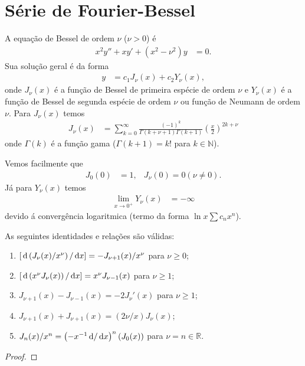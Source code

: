 \section{Série de Fourier-Bessel}
A equação de Bessel de ordem $\nu$ ($\nu > 0$) é
\begin{align*}
    x^2 y'' + x y' + \left( x^2 - \nu^2 \right) y &= 0.
\end{align*}
Sua solução geral é da forma
\begin{align*}
    y &= c_1 J_\nu(x) + c_2 Y_\nu(x),
\end{align*}
onde $J_\nu(x)$ é a função de Bessel de primeira espécie de ordem $\nu$ e $Y_\nu(x)$ é a função de Bessel de segunda espécie de ordem $\nu$ ou função de Neumann de ordem $\nu$. Para $J_\nu(x)$ temos
\begin{align*}
    J_\nu(x) &= \sum_{k = 0}^\infty \frac{(-1)^k}{\Gamma(k + \nu + 1) \Gamma(k + 1)} \left( \frac{x}{2} \right)^{2k + \nu}
\end{align*}
onde $\Gamma(k)$ é a função gama ($\Gamma(k + 1) = k!$ para $k \in \mathbb{N}$).

Vemos facilmente que
\begin{align*}
    J_0(0) &= 1, & J_\nu(0) = 0 (\nu \neq 0).
\end{align*}
Já para $Y_\nu(x)$ temos
\begin{align*}
    \lim_{x \to 0^+} Y_\nu(x) &= -\infty
\end{align*}
devido á convergência logaritmica (termo da forma $\ln x \sum c_n x^n$).
\begin{prop}
    As seguintes identidades e relações são válidas:
    \begin{enumerate}
        \item $\left[ \, \mathrm{d}\left( J_\nu(x) / x^\nu \right) / \, \mathrm{d}x \right] = - J_{\nu + 1}(x) / x^\nu$ para $\nu \geq 0$;
        \item $\left[ \, \mathrm{d}\left( x^\nu J_\nu(x) \right) / \, \mathrm{d}x \right] = x^\nu J_{\nu- 1}(x)$ para $\nu \geq 1$;
        \item $J_{\nu + 1}(x) - J_{\nu - 1}(x) = - 2 J_\nu'(x)$ para $\nu \geq 1$;
        \item $J_{\nu + 1}(x) + J_{\nu + 1}(x) = \left( 2 \nu / x \right) J_\nu(x)$;
        \item $J_n(x) / x^n = \left( -x^{-1} \, \mathrm{d} / \, \mathrm{d}x \right)^n \left( J_0(x) \right)$ para $\nu = n \in \mathbb{R}$.
    \end{enumerate}
\end{prop}
\begin{proof}
\end{proof}

